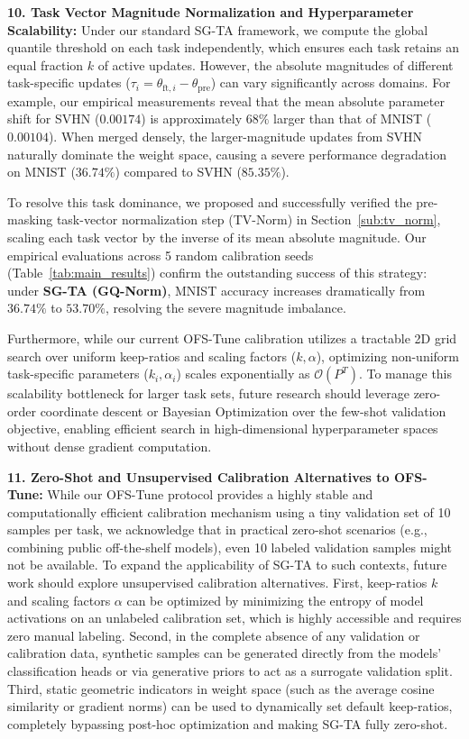 \textbf{10. Task Vector Magnitude Normalization and Hyperparameter Scalability:}
Under our standard SG-TA framework, we compute the global quantile threshold on each task independently, which ensures each task retains an equal fraction $k$ of active updates. However, the absolute magnitudes of different task-specific updates ($\tau_i = \theta_{\text{ft},i} - \theta_{\text{pre}}$) can vary significantly across domains. For example, our empirical measurements reveal that the mean absolute parameter shift for SVHN ($0.00174$) is approximately $68\%$ larger than that of MNIST ($0.00104$). When merged densely, the larger-magnitude updates from SVHN naturally dominate the weight space, causing a severe performance degradation on MNIST ($36.74\%$) compared to SVHN ($85.35\%$). 

To resolve this task dominance, we proposed and successfully verified the pre-masking task-vector normalization step (TV-Norm) in Section~\ref{sub:tv_norm}, scaling each task vector by the inverse of its mean absolute magnitude. Our empirical evaluations across 5 random calibration seeds (Table~\ref{tab:main_results}) confirm the outstanding success of this strategy: under \textbf{SG-TA (GQ-Norm)}, MNIST accuracy increases dramatically from $36.74\%$ to $53.70\%$, resolving the severe magnitude imbalance. 

Furthermore, while our current OFS-Tune calibration utilizes a tractable 2D grid search over uniform keep-ratios and scaling factors ($k, \alpha$), optimizing non-uniform task-specific parameters ($k_i, \alpha_i$) scales exponentially as $\mathcal{O}(P^T)$. To manage this scalability bottleneck for larger task sets, future research should leverage zero-order coordinate descent or Bayesian Optimization over the few-shot validation objective, enabling efficient search in high-dimensional hyperparameter spaces without dense gradient computation.

\textbf{11. Zero-Shot and Unsupervised Calibration Alternatives to OFS-Tune:}
While our OFS-Tune protocol provides a highly stable and computationally efficient calibration mechanism using a tiny validation set of 10 samples per task, we acknowledge that in practical zero-shot scenarios (e.g., combining public off-the-shelf models), even 10 labeled validation samples might not be available. To expand the applicability of SG-TA to such contexts, future work should explore unsupervised calibration alternatives. First, keep-ratios $k$ and scaling factors $\alpha$ can be optimized by minimizing the entropy of model activations on an unlabeled calibration set, which is highly accessible and requires zero manual labeling. Second, in the complete absence of any validation or calibration data, synthetic samples can be generated directly from the models' classification heads or via generative priors to act as a surrogate validation split. Third, static geometric indicators in weight space (such as the average cosine similarity or gradient norms) can be used to dynamically set default keep-ratios, completely bypassing post-hoc optimization and making SG-TA fully zero-shot.

